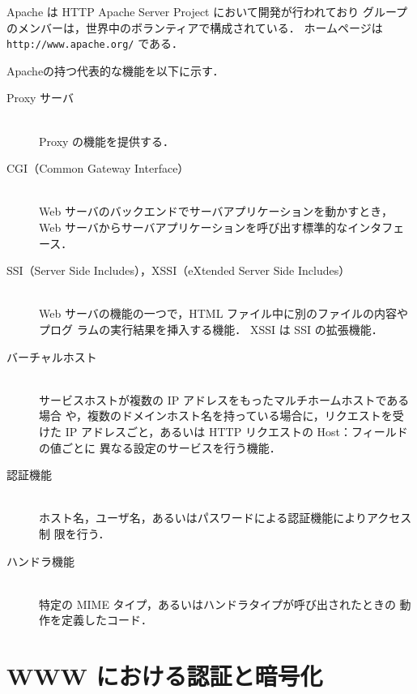 Apache は HTTP Apache Server Project において開発が行われており
グループのメンバーは，世界中のボランティアで構成されている．
ホームページは \texttt{http://www.apache.org/} である．

Apacheの持つ代表的な機能を以下に示す．

\begin{description}
 \item[Proxy サーバ] \ \\
      Proxy の機能を提供する．

 \item[CGI（Common Gateway Interface）] \ \\
      Web サーバのバックエンドでサーバアプリケーションを動かすとき，
      Web サーバからサーバアプリケーションを呼び出す標準的なインタフェース．

 \item[SSI（Server Side Includes），XSSI（eXtended Server Side Includes）] \ \\
      Web サーバの機能の一つで，HTML ファイル中に別のファイルの内容やプログ
      ラムの実行結果を挿入する機能．
      XSSI は SSI の拡張機能．

 \item[バーチャルホスト] \ \\
      サービスホストが複数の IP アドレスをもったマルチホームホストである場合
      や，複数のドメインホスト名を持っている場合に，リクエストを受けた %
      IP アドレスごと，あるいは HTTP リクエストの Host：フィールドの値ごとに
      異なる設定のサービスを行う機能．

 \item[認証機能] \ \\
      ホスト名，ユーザ名，あるいはパスワードによる認証機能によりアクセス制
      限を行う．

 \item[ハンドラ機能] \ \\
      特定の MIME タイプ，あるいはハンドラタイプが呼び出されたときの
      動作を定義したコード．
\end{description}

\section{WWW における認証と暗号化}

